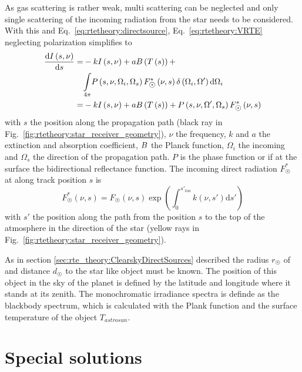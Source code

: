 As gas scattering is rather weak, multi scattering can be neglected and only
single scattering of the incoming radiation from the star needs to be considered. 
With this and Eq.~\ref{eq:rtetheory:directsource}, Eq.~\ref{eq:rtetheory:VRTE}
neglecting polarization simplifies to  
\begin{align}
	\label{eq:rtetheory:ClearskyRTE}
	\frac{\mathrm{d}I\left(s,\nu\right)}{\mathrm{d}s}= &
		-kI\left(s,\nu\right)+a\Planck\left(T\left(s\right)\right)+ \nonumber\\
		& \underset{4\pi}{\int}P\left(s, \nu,\Omega_{i},\Omega_{s}\right)
		F_{\astrosun}^{*}\left(\nu,s\right)\delta\left(\Omega_{i},\Omega'\right)
		\mathrm{d}\Omega_{i}\nonumber\\
		= & -kI\left(s,\nu\right)+a\Planck\left(T\left(s\right)\right)+
		P\left(s, \nu,\Omega',\Omega_{s}\right)F_{\astrosun}^{*}\left(\nu,s\right)
\end{align}
with $s$ the position along the propagation path (black ray in Fig.~\ref{fig:rtetheory:star_receiver_geometry}),
$\nu$ the frequency, $k$ and $a$ the extinction and absorption coefficient,
$B$ the Planck function, $\Omega_i$ the incoming and $\Omega_s$ the
direction of the propagation path.
$P$ is the phase function or if at the surface the bidirectional reflectance
function. The incoming direct radiation $F_{\astrosun}^{*}$ at along track position
$s$ is
\begin{equation}
	F_{\astrosun}^{*}\left(\nu,s\right)=F_{\astrosun}\left(\nu,s\right)
		\exp\left(\int_{0}^{s'_{toa}}k\left(\nu,s'\right)\mathrm{d}s'\right)
\end{equation}
with $s'$ the position along the path from the position $s$ to the top of the
atmosphere in the direction of the star (yellow rays in Fig.~\ref{fig:rtetheory:star_receiver_geometry}).
 

As in section \ref{sec:rte_theory:ClearskyDirectSources} described the radius $r_{\astrosun}$ of
and distance $d_{\astrosun}$ to the star like object must be known. The position of this object
in the sky of the planet is defined by the latitude and longitude where it stands at its zenith.
The monochromatic irradiance spectra is definde as the blackbody spectrum, which is calculated
with the Plank function and the surface temperature of the object $T_{astrosun}$.

\section{Special solutions}
\label{sec:rtetheory:special}
 
